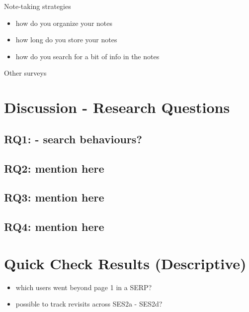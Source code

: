 \documentclass[letterpaper, nobind]{templates/ociamthesis}
\providecommand{\tightlist}{%
  \setlength{\itemsep}{0pt}\setlength{\parskip}{0pt}}
\begin{document}
Note-taking strategies

\begin{itemize}
\tightlist
\item
  how do you organize your notes
\item
  how long do you store your notes
\item
  how do you search for a bit of info in the notes
\end{itemize}

Other surveys

\hypertarget{discussion---research-questions}{%
\section{Discussion - Research Questions}\label{discussion---research-questions}}

\hypertarget{rq1---search-behaviours}{%
\subsection{RQ1: - search behaviours?}\label{rq1---search-behaviours}}

\hypertarget{rq2-mention-here}{%
\subsection{RQ2: mention here}\label{rq2-mention-here}}

\hypertarget{rq3-mention-here}{%
\subsection{RQ3: mention here}\label{rq3-mention-here}}

\hypertarget{rq4-mention-here}{%
\subsection{RQ4: mention here}\label{rq4-mention-here}}

\hypertarget{quick-check-results-descriptive}{%
\section{Quick Check Results (Descriptive)}\label{quick-check-results-descriptive}}

\begin{itemize}
\tightlist
\item
  which users went beyond page 1 in a SERP?
\item
  possible to track revisits across SES2a - SES2d?
\end{itemize}
\end{document}
